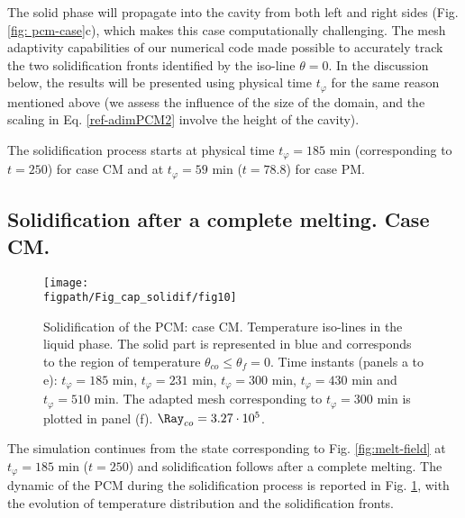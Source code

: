 \noindent The solid phase will propagate into the cavity from both left and right sides  (Fig. \ref{fig: pcm-case}c), which makes this case computationally challenging. The mesh adaptivity capabilities of our numerical code made possible to accurately track the 
two solidification fronts identified by the iso-line $\theta=0$.  
In the discussion below,  the results will be presented using physical time $t_{\varphi}$ for the same reason mentioned above (we assess the influence of the size of the domain, and the scaling in Eq. \ref{ref-adimPCM2} involve the height of the cavity).


\noindent The solidification process starts at physical time $t_{\varphi} = 185 $ min (corresponding to $t = 250 $) for case CM and at $t_{\varphi} = 59$ min ($t = 78.8 $) for case PM. 

\newpage
\subsection{Solidification after a complete melting. Case CM.} \label{sec_solid_full} 

\begin{figure}
	\begin{center}
		\texttt{[image: \\figpath/Fig\_cap\_solidif/fig10]}
	\end{center}
	\caption{Solidification of the PCM: case CM. 
	Temperature iso-lines in the liquid phase. 
	The solid part is represented in blue and corresponds to the region of temperature $\theta_{co} \leq \theta_f=0$. 
	Time instants (panels  a to e): $t_{\varphi} = 185$ min, $t_{\varphi} = 231$ min, $t_{\varphi} = 300$ min, $t_{\varphi} = 430$ min and $t_{\varphi} = 510$ min. 
	The adapted mesh corresponding to $t_{\varphi} = 300$ min is plotted in panel (f).  $\Ray_{co}=3.27 \cdot 10^5$. }\label{fig:evolution}
\end{figure}

The simulation continues from the state corresponding to Fig.  \ref{fig:melt-field} at $t_{\varphi} =185$ min ($t=250$) and solidification follows after a complete melting. 
The dynamic of the PCM during the solidification process is reported in Fig. \ref{fig:evolution}, with the evolution of temperature distribution and the solidification fronts.

